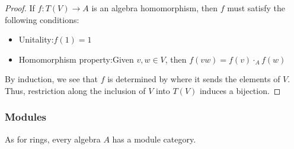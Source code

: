 \documentclass[../thesis.tex]{subfiles}
\begin{document}
            \begin{proof}
                If $f: T(V) \rightarrow A$ is an algebra homomorphism, then $f$ must satisfy the following conditions:
                \begin{itemize}
                    \item Unitality:\quad $f(1) = 1$
                    \item Homomorphism property:\quad Given $v,w\in V$, then $f(v w) = f(v)\cdot_Af(w)$
                \end{itemize}
                By induction, we see that $f$ is determined by where it sends the elements of $V$. Thus, restriction along the inclusion of $V$ into $T(V)$ induces a bijection.
            \end{proof}

            \subsubsection*{Modules}

                As for rings, every algebra $A$ has a module category.
\end{document}
